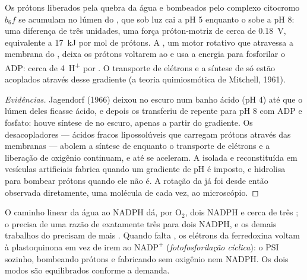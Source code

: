 \begin{theorem}\label{thm:b1:photosynthesis:chemiosmosis}
Os prótons liberados pela quebra da água e bombeados pelo complexo
citocromo $b_6f$ se acumulam no lúmen do , que sob luz cai a pH
5 enquanto o  sobe a pH 8: uma diferença de três unidades, uma
força próton-motriz de cerca de \qty{0.18}{V}, equivalente a
\qty{17}{kJ} por mol de prótons. A \emph{}, um motor rotativo
que atravessa a membrana do , deixa os prótons voltarem ao
 e usa a energia para fosforilar o ADP: cerca de \qty{4}{H^+} por
. O transporte de elétrons e a síntese de  só estão acoplados
através desse gradiente (a teoria quimiosmótica de Mitchell, 1961).
\end{theorem}
\begin{proof}[Evidências]
Jagendorf (1966) deixou  no escuro num banho ácido (pH 4) até
que o lúmen deles ficasse ácido, e depois os transferiu de repente para
pH 8 com ADP e fosfato: houve síntese de  no escuro, apenas a partir
do gradiente. Os desacopladores --- ácidos fracos lipossolúveis que
carregam prótons através das membranas --- abolem a síntese de 
enquanto o transporte de elétrons e a liberação de oxigênio continuam, e
até se aceleram. A  isolada e reconstituída em vesículas
artificiais fabrica  quando um gradiente de pH é imposto, e hidrolisa
 para bombear prótons quando ele não é. A rotação da  já foi
desde então observada diretamente, uma molécula de cada vez, ao
microscópio.
\end{proof}

\begin{example}\label{ex:b1:photosynthesis:cyclic}
O caminho linear da água ao NADPH dá, por $\mathrm{O_2}$, dois NADPH e
cerca de três ; o  precisa de uma razão de exatamente
três  para dois NADPH, e os demais trabalhos do  precisam
de mais . Quando falta , os elétrons da ferredoxina voltam à
plastoquinona em vez de irem ao $\mathrm{NADP^+}$
(\emph{fotofosforilação cíclica}): o PSI sozinho, bombeando prótons e
fabricando  sem oxigênio nem NADPH. Os dois modos são equilibrados
conforme a demanda.
\end{example}


